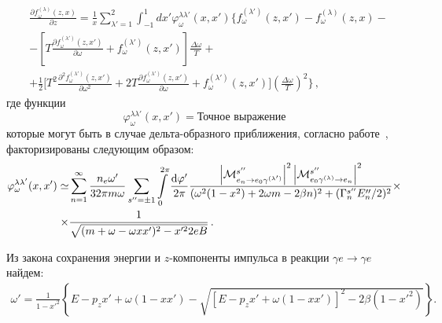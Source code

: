 \documentclass[14pt, russian]{article}
\newcommand{\dd}{\mathrm{d}} %
\begin{document}
\begin{equation}\label{eq:KinSerDeltaw}
	\begin{aligned}
		&\frac{\partial f^{(\lambda)}_\omega(z,x)}{\partial z} = \frac{1}{x} \sum_{\lambda'=1}^{2} \int_{-1}^{1}dx'\varphi_\omega^{\lambda\lambda'}(x,x')\bigg\{ f^{(\lambda')}_{\omega}(z,x')-f^{(\lambda)}_\omega(z,x) -
		\\
		&-  
		\left[
		T \frac{\partial f_\omega^{(\lambda')}(z,x')}{\partial \omega} + f_\omega^{(\lambda')}(z,x')
		\right]\frac{\Delta \omega}{T}+
		\\
		&+ \frac{1}{2}  
		\bigg[
		T^2 \frac{\partial^2 f_\omega^{(\lambda')}(z,x')}{\partial \omega^2}+ 2T \frac{\partial f_\omega^{(\lambda')}(z,x')}{\partial \omega}+f_\omega^{(\lambda')}(z,x')
		\bigg]\left(\frac{\Delta\omega}{T}\right)^2\bigg\}
		\,  ,
	\end{aligned}
\end{equation}
где функции
\begin{equation}
	\varphi^{\lambda \lambda'}_\omega(x,x') = \text{Точное выражение}
\end{equation}
которые могут быть в случае дельта-образного приближения, согласно работе~\cite{Rumyantsev:2017}, факторизированы следующим образом:
\begin{equation}
	\begin{aligned}
		\varphi^{\lambda \lambda'}_\omega(x,x') 
		\simeq&
		\sum_{n=1}^{\infty}
		\frac{n_e \omega'}{32 \pi m \omega} 
		\sum_{s''=\pm 1} 
		\int\limits_{0}^{2\pi}
		\frac{\dd\varphi'}{2\pi} 
		\frac{\left|{\cal M}^{s''}_{e_n\to e_0 \gamma^{(\lambda ')}}\right|^2\left|{\cal M}^{s''}_{ e_0 \gamma^{(\lambda)}\to e_n}\right|^2}
		{(\omega^2 (1-x^2)+ 2\omega m - 2\beta n)^2 + (\Gamma_n^{s''} E_n''/2)^2} 
		\times \\ \times
		&\frac{1}{\sqrt{(m+\omega - \omega x x')^2 - x'^2 2eB}}\, .
	\end{aligned}
\end{equation}


Из закона сохранения энергии и $z$-компоненты импульса в реакции  $\gamma e \to \gamma e$  найдем:
\begin{equation}
\begin{aligned}
\omega'=\frac{1}{1-x'^2}\left\{E- p_z x'+\omega(1- x x')-\sqrt{\left[E-p_z x'+\omega(1- x x')\right]^2-2\beta\left(1-x'^2\right)}\right\}.
\end{aligned}
\end{equation}
\end{document}
